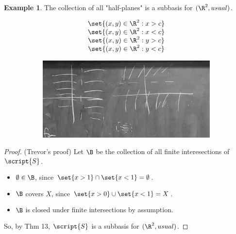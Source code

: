 \documentclass[a5paper]{article}
\theoremstyle{definition}%
\newtheorem*{example*}{Example}
\numberwithin{exercise}{section}
\theoremstyle{remark}%
\begin{document}
\begin{example*}
The collection of all "half-planes" is a subbasis for $(\R^2, usual)$. 

\begin{figure}[h]
\begin{subfigure}{0.5\textwidth}
\[
\begin{array}{c}
\set{(x,y)\in\R^2:x>c}\\
\set{(x,y)\in\R^2:x<c}\\
\set{(x,y)\in\R^2:y>c}\\
\set{(x,y)\in\R^2:y<c}\\
\end{array}
\]
\end{subfigure}
\begin{subfigure}{0.5\textwidth}
\includegraphics[scale=.3]{old_homework/topology_homework/half_planes}
\end{subfigure}
\end{figure}
\end{example*}
\begin{proof}(Trevor's proof) Let $\B$ be the collection of all finite interesections of $\script{S}$. 
\begin{itemize}
\item $\emptyset\in\B$, since $\set{x>1}\cap\set{x<1}=\emptyset$. 
\item $\B$ covers $X$, since $\set{x>0}\cup\set{x<1}=X$.
\item $\B$ is closed under finite intersections by assumption. 
\end{itemize}
So, by Thm 13, $\script{S}$ is a subbasis for $(\R^2, usual)$. 
\end{proof}


\pagebreak
\end{document}
